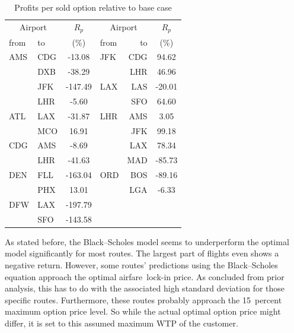\begin{table}
    \begin{center}
        \begin{tabular}{l l c| l r c}
            \toprule
             \multicolumn{2}{c}{Airport}  &  $R_p$   & \multicolumn{2}{c}{Airport}  &  $R_p$ \\
from  &  to  &  (\%) &  from  &  to  & (\%) \\
\midrule
AMS  &  CDG  &  -13.08  & JFK  &  CDG  &  94.62  \\
~    &  DXB  &  -38.29  & ~    &  LHR  &  46.96  \\
~    &  JFK  &  -147.49 & LAX  &  LAS  &  -20.01 \\
~    &  LHR  &  -5.60   & ~    &  SFO  &  64.60  \\ 
ATL  &  LAX  &  -31.87  & LHR  &  AMS  &   3.05  \\
~    &  MCO  &  16.91   & ~    &  JFK  &  99.18  \\
CDG  &  AMS  &  -8.69   & ~    &  LAX  &  78.34  \\
~    &  LHR  &  -41.63  & ~    &  MAD  &  -85.73 \\
DEN  &  FLL  &  -163.04 & ORD  &  BOS  &  -89.16 \\
~    &  PHX  &  13.01   & ~    &  LGA  &  -6.33  \\
DFW  &  LAX  &  -197.79 \\
~    &  SFO  &  -143.58 \\
            \bottomrule
        \end{tabular}
        \caption{Profits per sold option relative to base case}
        \label{tbl:resultsBSrelative}
    \end{center}
\end{table}


As stated before, the Black--Scholes model seems to underperform the optimal model significantly for most routes. The largest part of flights even shows a negative return. However, some routes' predictions using the Black--Scholes equation approach the optimal airfare~lock-in price. As concluded from prior analysis, this has to do with the associated high standard deviation for those specific routes. Furthermore, these routes probably approach the 15~percent maximum option price level. So while the actual optimal option price might differ, it is set to this assumed maximum WTP of the customer.


